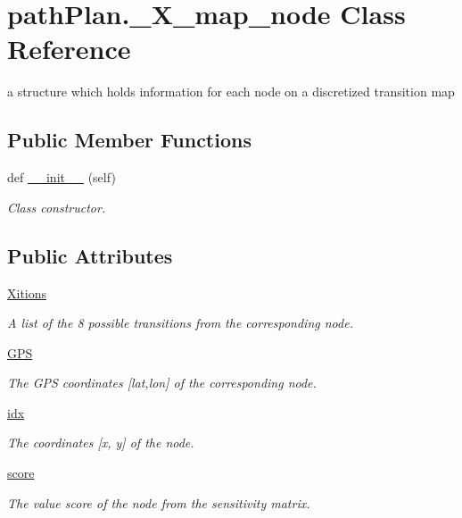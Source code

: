 \hypertarget{classpath_plan_1_1___x__map__node}{}\section{path\+Plan.\+\_\+\+X\+\_\+map\+\_\+node Class Reference}
\label{classpath_plan_1_1___x__map__node}


a structure which holds information for each node on a discretized transition map  


\subsection*{Public Member Functions}
\begin{DoxyCompactItemize}
\item 
def \mbox{\hyperlink{classpath_plan_1_1___x__map__node_a73f6059a5ffe61cf3c79d9ac682ccf92}{\+\_\+\+\_\+init\+\_\+\+\_\+}} (self)
\begin{DoxyCompactList}\small\item\em Class constructor. \end{DoxyCompactList}\end{DoxyCompactItemize}
\subsection*{Public Attributes}
\begin{DoxyCompactItemize}
\item 
\mbox{\hyperlink{classpath_plan_1_1___x__map__node_a6805d8c0c436764993a466767f4413b1}{Xitions}}
\begin{DoxyCompactList}\small\item\em A list of the 8 possible transitions from the corresponding node. \end{DoxyCompactList}\item 
\mbox{\hyperlink{classpath_plan_1_1___x__map__node_a4d104762b4f90c3b130ff6292732299d}{G\+PS}}
\begin{DoxyCompactList}\small\item\em The G\+PS coordinates \mbox{[}lat,lon\mbox{]} of the corresponding node. \end{DoxyCompactList}\item 
\mbox{\hyperlink{classpath_plan_1_1___x__map__node_ac9396adb5e65872faa6c73aa435cd66d}{idx}}
\begin{DoxyCompactList}\small\item\em The coordinates \mbox{[}x, y\mbox{]} of the node. \end{DoxyCompactList}\item 
\mbox{\hyperlink{classpath_plan_1_1___x__map__node_ab3d03c1c32cbad7dfbd6defca6987b17}{score}}
\begin{DoxyCompactList}\small\item\em The value score of the node from the sensitivity matrix. \end{DoxyCompactList}\end{DoxyCompactItemize}


